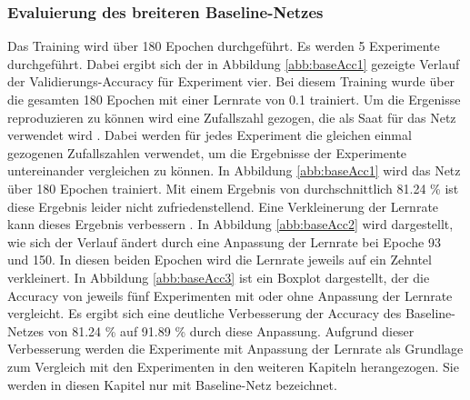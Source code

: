 \subsubsection{Evaluierung des breiteren Baseline-Netzes}
Das Training wird über 180 Epochen durchgeführt. Es werden 5 Experimente durchgeführt. Dabei ergibt sich der in Abbildung \ref{abb:baseAcc1} gezeigte Verlauf der Validierungs-Accuracy für Experiment vier. Bei diesem Training wurde über die gesamten 180 Epochen mit einer Lernrate von 0.1 trainiert. Um die Ergenisse reproduzieren zu können wird eine Zufallszahl gezogen, die als Saat für das Netz verwendet wird \cite{repro}. Dabei werden für jedes Experiment die gleichen einmal gezogenen Zufallszahlen verwendet, um die Ergebnisse der Experimente untereinander vergleichen zu können.
In Abbildung \ref{abb:baseAcc1} wird das Netz über 180 Epochen trainiert. Mit einem Ergebnis von durchschnittlich 81.24 \% ist diese Ergebnis leider nicht zufriedenstellend. Eine Verkleinerung der Lernrate kann dieses Ergebnis verbessern . In Abbildung \ref{abb:baseAcc2} wird dargestellt, wie sich der Verlauf ändert durch eine Anpassung der Lernrate bei Epoche 93 und 150. In diesen beiden Epochen wird die Lernrate jeweils auf ein Zehntel verkleinert. In Abbildung \ref{abb:baseAcc3} ist ein Boxplot dargestellt, der die Accuracy von jeweils fünf Experimenten mit oder ohne Anpassung der Lernrate vergleicht. Es ergibt sich eine deutliche Verbesserung der Accuracy des Baseline-Netzes von 81.24 \% auf 91.89 \% durch diese Anpassung. Aufgrund dieser Verbesserung werden die Experimente mit Anpassung der Lernrate als Grundlage zum Vergleich mit den Experimenten in den weiteren Kapiteln herangezogen. Sie werden in diesen Kapitel nur mit Baseline-Netz bezeichnet.

